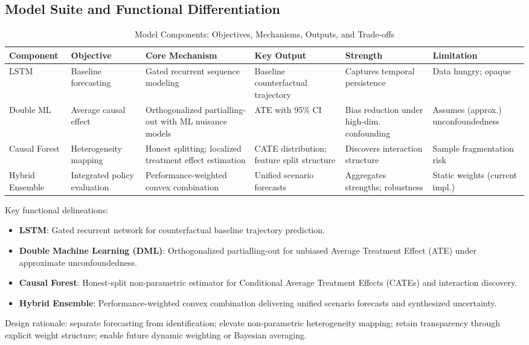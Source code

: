 \subsection{Model Suite and Functional Differentiation}
\begin{table}[htbp]
\centering
\small
\caption{Model Components: Objectives, Mechanisms, Outputs, and Trade-offs}
\label{tab:model_comparison}
\setlength{\tabcolsep}{4pt}
\renewcommand{\arraystretch}{1.12}
\begin{tabular}{|p{2.2cm}|p{2.3cm}|p{3.0cm}|p{2.5cm}|p{2.3cm}|p{2.4cm}|}
\hline
\textbf{Component} & \textbf{Objective} & \textbf{Core Mechanism} & \textbf{Key Output} & \textbf{Strength} & \textbf{Limitation} \\
\hline
LSTM & Baseline forecasting & Gated recurrent sequence modeling & Baseline counterfactual trajectory & Captures temporal persistence & Data hungry; opaque \\
\hline
Double ML & Average causal effect & Orthogonalized partialling-out with ML nuisance models & ATE with 95\% CI & Bias reduction under high-dim. confounding & Assumes (approx.) unconfoundedness \\
\hline
Causal Forest & Heterogeneity mapping & Honest splitting; localized treatment effect estimation & CATE distribution; feature split structure & Discovers interaction structure & Sample fragmentation risk \\
\hline
Hybrid Ensemble & Integrated policy evaluation & Performance-weighted convex combination & Unified scenario forecasts & Aggregates strengths; robustness & Static weights (current impl.) \\
\hline
\end{tabular}
\end{table}
Key functional delineations:
\begin{itemize}
  \item \textbf{LSTM}: Gated recurrent network for counterfactual baseline trajectory prediction.
  \item \textbf{Double Machine Learning (DML)}: Orthogonalized partialling-out for unbiased Average Treatment Effect (ATE) under approximate unconfoundedness.
  \item \textbf{Causal Forest}: Honest-split non-parametric estimator for Conditional Average Treatment Effects (CATEs) and interaction discovery.
  \item \textbf{Hybrid Ensemble}: Performance-weighted convex combination delivering unified scenario forecasts and synthesized uncertainty.
\end{itemize}
Design rationale: separate forecasting from identification; elevate non-parametric heterogeneity mapping; retain transparency through explicit weight structure; enable future dynamic weighting or Bayesian averaging.

